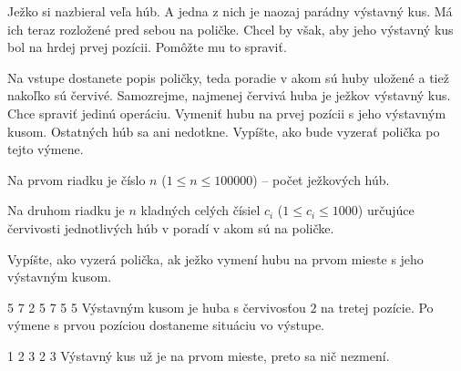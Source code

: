 




Ježko si nazbieral veľa húb. A jedna z nich je naozaj parádny výstavný kus. Má ich teraz rozložené
pred sebou na poličke. Chcel by však, aby jeho výstavný kus bol na hrdej prvej pozícii. Pomôžte mu
to spraviť.


Na vstupe dostanete popis poličky, teda poradie v akom sú huby uložené a tiež nakoľko sú červivé.
Samozrejme, najmenej červivá huba je ježkov výstavný kus. Chce spraviť jedinú operáciu. Vymeniť hubu
na prvej pozícii s jeho výstavným kusom. Ostatných húb sa ani nedotkne. Vypíšte, ako bude vyzerať
polička po tejto výmene.


Na prvom riadku je číslo $n$ ($1 \leq n \leq 100000$) -- počet ježkových húb.

Na druhom riadku je $n$ kladných celých čísiel $c_i$ ($1 \leq c_i \leq 1000$) určujúce červivosti
jednotlivých húb v poradí v akom sú na poličke.


Vypíšte, ako vyzerá polička, ak ježko vymení hubu na prvom mieste s jeho výstavným kusom.


5 7 2 5
 7 5 5
\komentar
Výstavným kusom je huba s červivosťou $2$ na tretej pozície. Po výmene s prvou pozíciou dostaneme
situáciu vo výstupe.
\koniec

1 2 3
 2 3
\komentar
Výstavný kus už je na prvom mieste, preto sa nič nezmení.
\koniec


